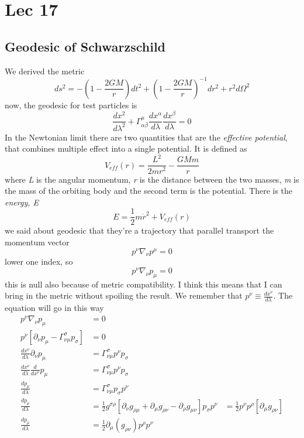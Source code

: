 \section{Lec 17}
\subsection{Geodesic of Schwarzschild}
We derived the metric 
\[
ds^{2} = - \left( 1- \frac{2GM}{r} \right)dt^{2} + \left( 1- \frac{2GM}{r} \right)^{-1}dr^{2} + r^{2} d\Omega ^{2}
\]
now, the geodesic for test particles is
\[
\frac{d x^{2}}{d \lambda ^{2}} + \Gamma ^{\mu }_{\alpha \beta } \frac{d x^{\alpha }}{d \lambda }\frac{d x^{\beta }}{d \lambda } = 0
\]
In the Newtonian limit there are two quantities that are the \emph{effective potential}, that combines multiple effect into a single potential. It is defined as
\[
V_{eff}\left( r \right) = \frac{L^{2}}{2mr^{2}} - \frac{GMm}{r}
\]
where \emph{L} is the angular momentum, \emph{r} is the distance between the two masses, \emph{m} is the mass of the orbiting body and the second term is the potential.
There is the \emph{energy, E}
\[
	E = \frac{1}{2}m\dot{r}^{2} + V_{eff}\left( r \right)
\]
we said about geodesic that they're a trajectory that parallel transport  the momentum vector
\[
p^{\nu }\nabla _{\nu }p^{\mu } = 0
\]
lower one index, so
\[
p^{\nu }\nabla _{\nu }p_{\mu } = 0
\]
this is null also because of metric compatibility. I think this means that I can bring in the metric without spoiling the result. We remember that $p^{\nu } \equiv \frac{d x^{\nu }}{d \lambda }$.
The equation will go in this way
\begin{align}
	p^{\nu }\nabla _{\nu }p_{\mu } &= 0 \\
	p^{\nu }\left[ \partial_{\nu }p_{\mu } - \Gamma ^{\sigma }_{\nu \mu }p_{\sigma } \right] & = 0 \\
	\frac{d x^{\nu }}{d \lambda } \partial_{\nu }p_{\mu } &= \Gamma ^{\sigma }_{\nu \mu }p^{\nu }p_{\sigma } \\
	\frac{d x^{\nu }}{d \lambda }\frac{d }{d x^{ \nu }}p_{\mu } & = \Gamma ^{\sigma }_{\nu \mu }p^{\nu }p_{\sigma } \\
	\frac{d p_{\mu }}{d \lambda } &= \Gamma ^{\sigma }_{\nu \mu } p_{\sigma }p^{\nu }\\
	\frac{d p_{\mu }}{d \lambda } &= \frac{1}{2}g^{\sigma \rho } \left[ \partial_{\nu }g_{\rho \mu } + \partial_{\mu }g_{\rho \nu } - \partial_{\rho }g_{\mu \nu } \right] p_{\sigma }p^{\nu }
				      &= \frac{1}{2} p^{\nu }p^{\rho } \left[ \partial_{\mu }g_{\rho \nu } \right] \\
				     \frac{d p_{\mu }}{d \lambda } &= \frac{1}{2} \partial_{\mu }\left( g_{\rho \nu } \right) p^{\rho }p^{\nu } \\
\end{align}
